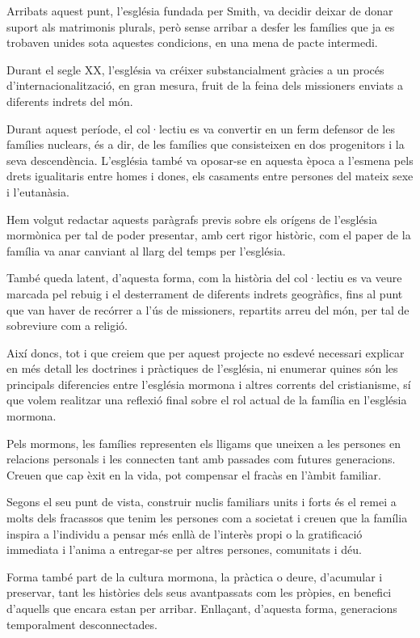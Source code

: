     Arribats aquest punt, l'església fundada per Smith, va decidir deixar de donar suport als matrimonis plurals, però sense arribar a desfer les famílies que ja es trobaven unides sota aquestes condicions, en una mena de pacte intermedi.

    Durant el segle XX, l'església va créixer substancialment gràcies a un procés d'internacionalització, en gran mesura, fruit de la feina dels missioners enviats a diferents indrets del món.

    Durant aquest període, el col·lectiu es va convertir en un ferm defensor de les famílies nuclears, és a dir, de les famílies que consisteixen en dos progenitors i la seva descendència. L'església també va oposar-se en aquesta època a l'esmena pels drets igualitaris entre homes i dones, els casaments entre persones del mateix sexe i l'eutanàsia.

    Hem volgut redactar aquests paràgrafs previs sobre els orígens de l'església mormònica per tal de poder presentar, amb cert rigor històric, com el paper de la família va anar canviant al llarg del temps per l'església.

    També queda latent, d'aquesta forma, com la història del col·lectiu es va veure marcada pel rebuig i el desterrament de diferents indrets geogràfics, fins al punt que van haver de recórrer a l'ús de missioners, repartits arreu del món, per tal de sobreviure com a religió.

    Així doncs, tot i que creiem que per aquest projecte no esdevé necessari explicar en més detall les doctrines i pràctiques de l'església, ni  enumerar quines són les principals diferencies entre l'església mormona i altres corrents del cristianisme, sí que volem realitzar una reflexió final sobre el rol actual de la família en l'església mormona.

    Pels mormons, les famílies representen els lligams que uneixen a les persones en relacions personals i les connecten tant amb passades com futures generacions. Creuen que cap èxit en la vida, pot compensar el fracàs en l'àmbit familiar.

    Segons el seu punt de vista, construir nuclis familiars units i forts és el remei a molts dels fracassos que tenim les persones com a societat i creuen que la família inspira a l'individu a pensar més enllà de l'interès propi o la gratificació immediata i l'anima a entregar-se per altres persones, comunitats i déu.

    Forma també part de la cultura mormona, la pràctica o deure, d'acumular i preservar, tant les històries dels seus avantpassats com les pròpies, en benefici d'aquells que encara estan per arribar. Enllaçant, d'aquesta forma, generacions temporalment desconnectades.

